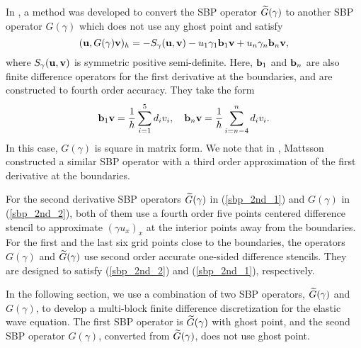  In \cite{wang2018fourth}, a method was developed to convert the SBP operator $\widetilde{G}(\gamma)$ to another SBP operator $G(\gamma)$ which does not use any ghost point and satisfy
 \begin{equation}\label{sbp_2nd_2}
 ({\bf u}, G(\gamma){\bf v})_h = -S_\gamma({\bf u},{\bf v})-u_1\gamma_1{\bf b}_1{\bf v} + u_n\gamma_n{\bf b}_n{\bf v},
 \end{equation}
 where $S_\gamma({\bf u},{\bf v})$ is symmetric positive semi-definite. 
 Here, ${\bf b}_1$ and ${\bf b}_n$ are also finite difference operators for the first derivative at the boundaries, and are constructed to fourth order accuracy. They take the form
 \begin{equation}\label{sbp_1st_2}
 {\bf b}_1 {\bf v} = \frac{1}{h}\sum_{i=1}^{5} d_i v_i,\quad {\bf b}_n {\bf v} = \frac{1}{h}\sum_{i=n-4}^{n} d_i v_i.
 \end{equation}
   In this case, ${G}(\gamma)$ is square in matrix form. We note that in  \cite{Mattsson2012}, Mattsson constructed a similar SBP operator with a third order approximation of the first derivative at the boundaries.  %
 
For the second derivative SBP operators $\widetilde{G}(\gamma)$ in (\ref{sbp_2nd_1}) and $G(\gamma)$ in (\ref{sbp_2nd_2}), both of them use a fourth order five points centered difference stencil to approximate $(\gamma u_x)_x$ at the interior points away from the boundaries. For the first and the last six grid points close to the boundaries, the operators $G(\gamma)$ and $\widetilde{G}(\gamma)$ use second order accurate one-sided difference stencils. They are designed to satisfy (\ref{sbp_2nd_2}) and (\ref{sbp_2nd_1}), respectively.

In the following section, we use a combination of two SBP operators, $\widetilde{G}(\gamma)$ and $G(\gamma)$, to develop a multi-block finite difference discretization for the elastic wave equation. The first SBP operator is $\widetilde{G}(\gamma)$ with ghost point, and the seond SBP operator $G(\gamma)$, converted from $\widetilde{G}(\gamma)$, does not use ghost point.
